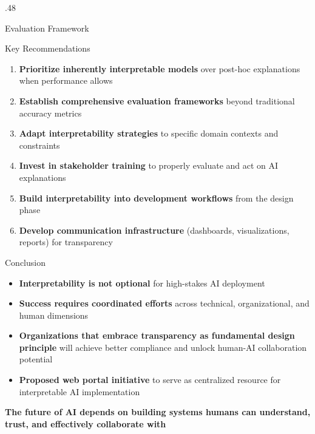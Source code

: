 \documentclass[final,t]{beamer}
\begin{document}
\begin{frame}[t]
\begin{columns}[t]
\begin{column}{.48\linewidth}
\begin{block}{\Large Evaluation Framework}
\begin{center}
\end{center}
\end{block}

\vspace{0.5cm}

\begin{block}{\Large Key Recommendations}
\begin{enumerate}[leftmargin=*, font=\Large\bfseries]
\item \textbf{Prioritize inherently interpretable models} over post-hoc explanations when performance allows
\item \textbf{Establish comprehensive evaluation frameworks} beyond traditional accuracy metrics
\item \textbf{Adapt interpretability strategies} to specific domain contexts and constraints
\item \textbf{Invest in stakeholder training} to properly evaluate and act on AI explanations
\item \textbf{Build interpretability into development workflows} from the design phase
\item \textbf{Develop communication infrastructure} (dashboards, visualizations, reports) for transparency
\end{enumerate}
\end{block}

\vspace{0.5cm}

\begin{block}{\Large Conclusion}
\begin{itemize}[leftmargin=*]
\item \textbf{Interpretability is not optional} for high-stakes AI deployment
\item \textbf{Success requires coordinated efforts} across technical, organizational, and human dimensions
\item \textbf{Organizations that embrace transparency as fundamental design principle} will achieve better compliance and unlock human-AI collaboration potential
\item \textbf{Proposed web portal initiative} to serve as centralized resource for interpretable AI implementation
\end{itemize}

\vspace{0.3cm}
\centering
\colorbox{green!30}{\parbox{0.9\linewidth}{\centering\Large\textbf{The future of AI depends on building systems humans can understand, trust, and effectively collaborate with}}}
\end{block}


\end{column}
\end{columns}
\end{frame}
\end{document}
